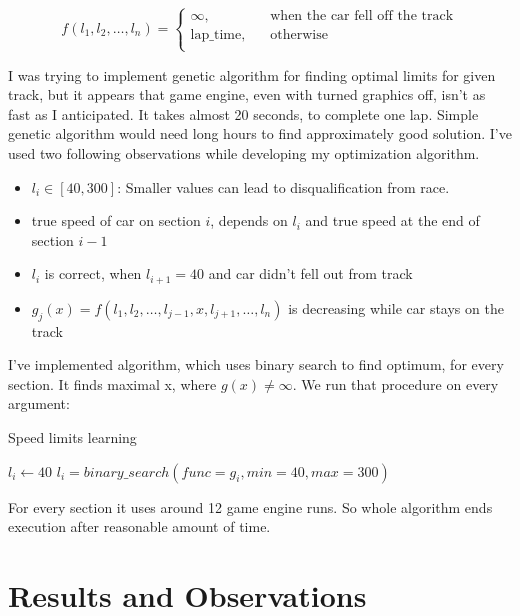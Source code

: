\documentclass[declaration,shortabstract,english,inz]{iithesis}
\begin{document}
$$ f(l_1, l_2, \dots, l_n ) =  \begin{cases}
    \infty, &\quad \text{when the car fell off the track}\\
    \text{lap\_time}, &\quad \text{otherwise} \\
  \end{cases}
 $$

I was trying to implement genetic algorithm for finding optimal limits for given track, but it appears that game engine, even with turned graphics off, isn't as fast as I anticipated.
It takes almost 20 seconds, to complete one lap.
Simple genetic algorithm would need long hours to find approximately good solution.
I've used two following observations while developing my optimization algorithm.

\begin{itemize}
    \item  $l_i \in [40, 300]$:  Smaller values can lead to disqualification from race.
    \item  true speed of car on section $i$, depends on $l_i$ and true speed at the end of section $i-1$
    \item
    $l_i$ is correct, when $l_{i+1} = 40$ and car didn't fell out from track
    \item  $g_j(x) = f(l_1,l_2, \dots,l_{j-1}, x, l_{j+1}, \dots, l_n)$ is decreasing while car stays on the track
    
\end{itemize}


I've implemented algorithm, which uses binary search to find optimum, for every section.
It finds maximal x, where $g(x) \neq \infty$.
We run that procedure on every argument:

\begin{algorithm}
    \caption{Speed limits learning}
    \label{alg:speed_limits}
    \begin{algorithmic}
        \STATE $l_i\gets 40$
            \STATE $l_i = binary\_search(func=g_i, min=40, max=300)$
        \ENDFOR
    \end{algorithmic}
\end{algorithm}


For every section it uses around 12 game engine runs.
So whole algorithm ends execution after reasonable amount of time.

\section{Results and Observations}
\end{document}
